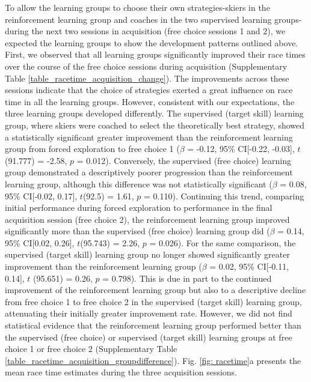 To allow the learning groups to choose their own strategies-skiers in the reinforcement learning group and coaches in the two supervised learning groups-during the next two sessions in acquisition (free choice sessions 1 and 2), we expected the learning groups to show the development patterns outlined above. First, we observed that all learning groups significantly improved their race times over the course of the free choice sessions during acquisition (Supplementary Table \ref{table_racetime_acquisition_change}). The improvements across these sessions indicate that the choice of strategies exerted a great influence on race time in all the learning groups. However, consistent with our expectations, the three learning groups developed differently. The supervised (target skill) learning group, where skiers were coached to select the theoretically best strategy, showed a statistically significant greater improvement than the reinforcement learning group from forced exploration to free choice 1 ($\beta$ = -0.12, 95\% CI[-0.22, -0.03], $t$(91.777) = -2.58, $p$ = 0.012). Conversely, the supervised (free choice) learning group demonstrated a descriptively poorer progression than the reinforcement learning group, although this difference was not statistically significant ($\beta$ = 0.08, 95\% CI[-0.02, 0.17], $t$(92.5) = 1.61, $p$ = 0.110). Continuing this trend, comparing initial performance during forced exploration to performance in the final acquisition session (free choice 2), the reinforcement learning group improved significantly more than the supervised (free choice) learning group did ($\beta$ = 0.14, 95\% CI[0.02, 0.26], $t$(95.743) = 2.26, $p$ = 0.026). For the same comparison, the supervised (target skill) learning group no longer showed significantly greater improvement than the reinforcement learning group  ($\beta$ = 0.02, 95\% CI[-0.11, 0.14], $t$
(95.651) = 0.26, $p$ = 0.798). This is due in part to the continued improvement of the reinforcement learning group but also to a descriptive decline from free choice 1 to free choice 2 in the supervised (target skill) learning group, attenuating their initially greater improvement rate. However, we did not find statistical evidence that the reinforcement learning group performed better than the supervised (free choice) or supervised (target skill) learning groups at free choice 1 or free choice 2 (Supplementary Table \ref{table_racetime_acquisition_groupdifference}). Fig. \ref{fig: racetime}a presents the mean race time estimates during the three acquisition sessions. 


